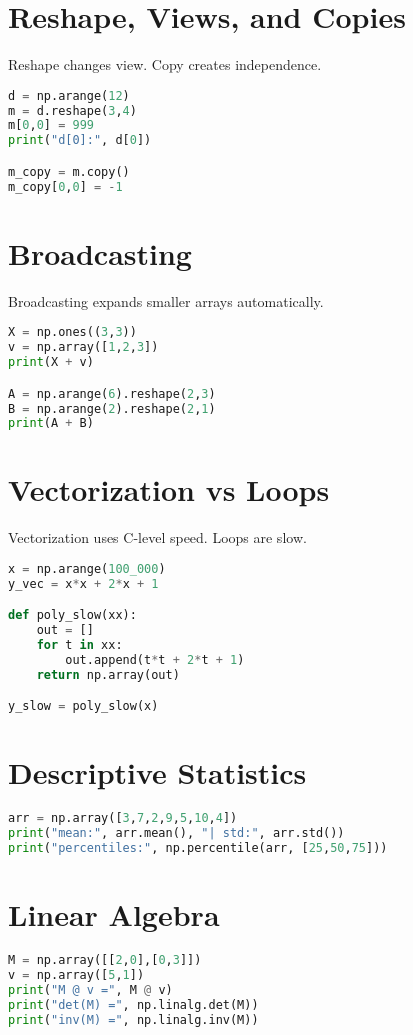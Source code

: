 \section{Reshape, Views, and Copies}
Reshape changes view. Copy creates independence.
\begin{lstlisting}[language=Python]
d = np.arange(12)
m = d.reshape(3,4)
m[0,0] = 999
print("d[0]:", d[0])

m_copy = m.copy()
m_copy[0,0] = -1
\end{lstlisting}

\section{Broadcasting}
Broadcasting expands smaller arrays automatically.
\begin{lstlisting}[language=Python]
X = np.ones((3,3))
v = np.array([1,2,3])
print(X + v)

A = np.arange(6).reshape(2,3)
B = np.arange(2).reshape(2,1)
print(A + B)
\end{lstlisting}

\section{Vectorization vs Loops}
Vectorization uses C-level speed. Loops are slow.
\begin{lstlisting}[language=Python]
x = np.arange(100_000)
y_vec = x*x + 2*x + 1

def poly_slow(xx):
    out = []
    for t in xx:
        out.append(t*t + 2*t + 1)
    return np.array(out)

y_slow = poly_slow(x)
\end{lstlisting}

\section{Descriptive Statistics}
\begin{lstlisting}[language=Python]
arr = np.array([3,7,2,9,5,10,4])
print("mean:", arr.mean(), "| std:", arr.std())
print("percentiles:", np.percentile(arr, [25,50,75]))
\end{lstlisting}

\section{Linear Algebra}
\begin{lstlisting}[language=Python]
M = np.array([[2,0],[0,3]])
v = np.array([5,1])
print("M @ v =", M @ v)
print("det(M) =", np.linalg.det(M))
print("inv(M) =", np.linalg.inv(M))
\end{lstlisting}

